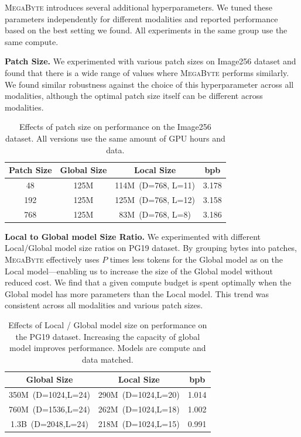 \documentclass{article}
\newcommand{\fastslow}[0]{\textsc{MegaByte}\xspace}
\newcommand{\megabyte}[0]{\fastslow}
\newcommand{\bpb}[0]{bpb\xspace}
\theoremstyle{plain}
\theoremstyle{definition}
\theoremstyle{remark}
\begin{document}
\megabyte introduces several additional hyperparameters. We tuned these parameters independently for different modalities and reported performance based on the best setting we found. All experiments in the same group use the same compute. 

\textbf{Patch Size.} We experimented with various patch sizes on Image256 dataset and found that there is a wide range of values where \megabyte performs similarly. We found similar robustness against the choice of this hyperparameter across all modalities, although the optimal patch size itself can be different across modalities.

\begin{table}[h]
    \centering\small
    \begin{tabular}{cccc}
    \toprule
    Patch Size & Global Size & Local Size & \bpb \\
    \midrule
    48 & 125M & 114M~(D=768, L=11)  & 3.178 \\
    192 & 125M & 125M~(D=768, L=12)  & 3.158 \\
    768 & 125M & 83M~(D=768, L=8) & 3.186 \\
    \bottomrule
    \end{tabular}
    \caption{Effects of patch size on performance on the Image256 dataset. All versions use the same amount of GPU hours and data.}
    \label{tab:hyperparams_ablation}
\end{table}

\textbf{Local to Global model Size Ratio.} We experimented with different Local/Global model size ratios on PG19 dataset. By grouping bytes into patches, \megabyte effectively uses $P$ times less tokens for the Global model as on the Local model---enabling us to increase the size of the Global model without reduced cost. We find that a given compute budget is spent optimally when the Global model has more parameters than the Local model. This trend was consistent across all modalities and various patch sizes.

\begin{table}[t]
    \centering\footnotesize	
    \begin{tabular}{ccc}
    \toprule
    Global Size & Local Size & \bpb \\
    \midrule
   350M~(D=1024,L=24)  & 290M~(D=1024,L=20) & 1.014  \\
    760M~(D=1536,L=24) & 262M~(D=1024,L=18) & 1.002  \\
    1.3B~(D=2048,L=24)  & 218M~(D=1024,L=15) & 0.991  \\
    \bottomrule
    \end{tabular}
    \caption{Effects of Local / Global model size on performance on the PG19 dataset. Increasing the capacity of global model improves performance. Models are compute and data matched.}
    \label{tab:size_inference}
\end{table}
\end{document}
